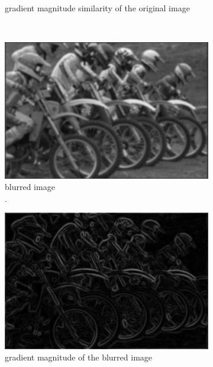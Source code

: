 \begin{figure}
\begin{subfigure}[b]{0.3\textwidth}
         \caption{gradient magnitude similarity of the original image}
         \label{fig:gmsd_ref_sim}
     \end{subfigure}
     \\
     \begin{subfigure}[b]{0.3\textwidth}
         \centering
         \includegraphics[width=\textwidth]{./figs/blur_gry}
         \caption{blurred image\\.}
         \label{fig:gmsd_blur_gry}
     \end{subfigure}
     \hfill
     \begin{subfigure}[b]{0.3\textwidth}
         \centering
         \includegraphics[width=\textwidth]{./figs/blur_mag}
         \caption{gradient magnitude of the blurred image}
         \label{fig:gmsd_blur_mag}
     \end{subfigure}
     \hfill
     \begin{subfigure}[b]{0.3\textwidth}

\end{subfigure}
\end{figure}
